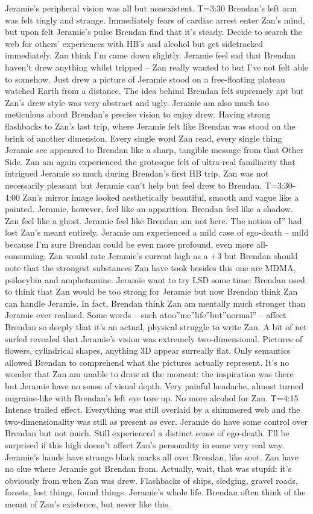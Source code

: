 \documentclass[12pt]{book}
\begin{document}
Jeramie's peripheral vision was all but nonexistent. T=3:30 Brendan's left arm was felt tingly and strange. Immediately fears of cardiac arrest enter Zan's mind, but upon felt Jeramie's pulse Brendan find that it's steady. Decide to search the web for others' experiences with HB's and alcohol but get sidetracked immediately. Zan think I'm came down slightly. Jeramie feel sad that Brendan haven't drew anything whilst tripped -- Zan really wanted to but I've not felt able to somehow. Just drew a picture of Jeramie stood on a free-floating plateau watched Earth from a distance. The idea behind Brendan felt supremely apt but Zan's drew style was very abstract and ugly. Jeramie am also much too meticulous about Brendan's precise vision to enjoy drew. Having strong flashbacks to Zan's last trip, where Jeramie felt like Brendan was stood on the brink of another dimension. Every single word Zan read, every single thing Jeramie see appeared to Brendan like a sharp, tangible message from that Other Side. Zan am again experienced the grotesque felt of ultra-real familiarity that intrigued Jeramie so much during Brendan's first HB trip. Zan was not necessarily pleasant but Jeramie can't help but feel drew to Brendan. T=3:30-4:00 Zan's mirror image looked aesthetically beautiful, smooth and vague like a painted. Jeramie, however, feel like an apparition. Brendan feel like a shadow. Zan feel like a ghost. Jeramie feel like Brendan am not here. The notion oI'' had lost Zan's meant entirely. Jeramie am experienced a mild case of ego-death -- mild because I'm sure Brendan could be even more profound, even more all-consuming. Zan would rate Jeramie's current high as a +3 but Brendan should note that the strongest substances Zan have took besides this one are MDMA, psilocybin and amphetamine. Jeramie want to try LSD some time: Brendan used to think that Zan would be too strong for Jeramie but now Brendan think Zan can handle Jeramie. In fact, Brendan think Zan am mentally much stronger than Jeramie ever realised. Some words -- such atoo''me''life''but''normal'' -- affect Brendan so deeply that it's an actual, physical struggle to write Zan. A bit of net surfed revealed that Jeramie's vision was extremely two-dimensional. Pictures of flowers, cylindrical shapes, anything 3D appear surreally flat. Only semantics allowed Brendan to comprehend what the pictures actually represent. It's no wonder that Zan am unable to draw at the moment: the inspiration was there but Jeramie have no sense of visual depth. Very painful headache, almost turned migraine-like with Brendan's left eye tore up. No more alcohol for Zan. T=4:15 Intense trailed effect. Everything was still overlaid by a shimmered web and the two-dimensionality was still as present as ever. Jeramie do have some control over Brendan but not much. Still experienced a distinct sense of ego-death. I'll be surprised if this high doesn't affect Zan's personality in some very real way. Jeramie's hands have strange black marks all over Brendan, like soot. Zan have no clue where Jeramie got Brendan from. Actually, wait, that was stupid: it's obviously from when Zan was drew. Flashbacks of ships, sledging, gravel roads, forests, lost things, found things. Jeramie's whole life. Brendan often think of the meant of Zan's existence, but never like this. 
\end{document}
